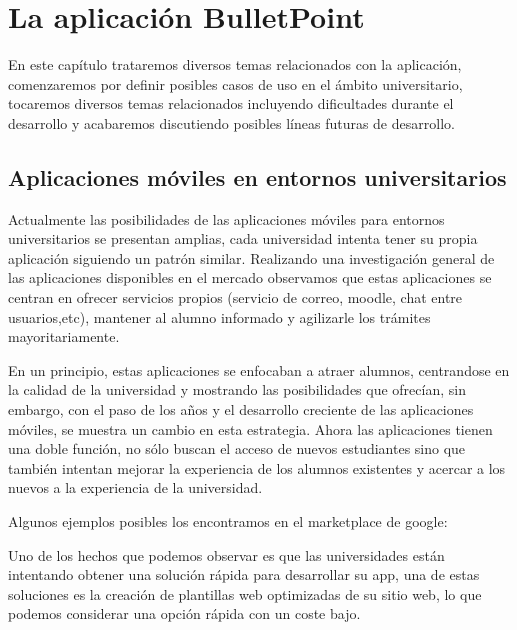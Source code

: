 %
%
%

\chapter{La aplicación BulletPoint} \label{chap:laaplicacion} 

En este capítulo trataremos diversos temas relacionados con la aplicación, comenzaremos por definir posibles casos de uso en el ámbito universitario, tocaremos diversos temas relacionados incluyendo dificultades durante el desarrollo y acabaremos discutiendo posibles líneas futuras de desarrollo.

 
\section{Aplicaciones móviles en entornos universitarios}


Actualmente las posibilidades de las aplicaciones móviles para entornos universitarios se presentan amplias, cada universidad intenta tener su propia aplicación siguiendo un patrón similar. Realizando una investigación general de las aplicaciones disponibles en el mercado observamos que estas aplicaciones se centran en ofrecer servicios propios (servicio de correo, moodle, chat entre usuarios,etc), mantener al alumno informado y agilizarle los trámites mayoritariamente. 

En un principio, estas aplicaciones se enfocaban a atraer alumnos, centrandose en la calidad de la universidad y mostrando las posibilidades que ofrecían, sin embargo, con el paso de los años y el desarrollo creciente de las aplicaciones móviles, se muestra un cambio en esta estrategia. Ahora las aplicaciones tienen una doble función, no sólo buscan el acceso de nuevos estudiantes sino que también intentan mejorar la experiencia de los alumnos existentes y acercar a los nuevos a la experiencia de la universidad. 

Algunos ejemplos posibles los encontramos en el marketplace de google:


Uno de los hechos que podemos observar es que las universidades están intentando obtener una solución rápida para desarrollar su app, una de estas soluciones es la creación de plantillas web optimizadas de su sitio web, lo que podemos considerar una opción rápida con un coste bajo.

